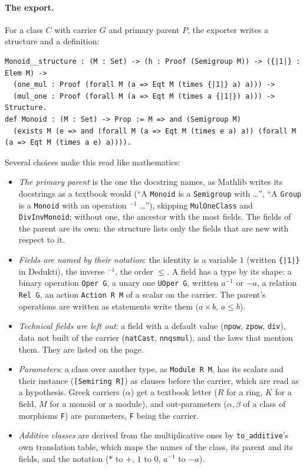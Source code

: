 \documentclass{easychair}
\newcommand{\ttt}[1]{\texttt{#1}}
\begin{document}
\paragraph{The export.} For a class $C$ with carrier $G$ and primary parent $P$, the exporter
writes a structure and a definition:
\begin{lstlisting}
Monoid__structure : (M : Set) -> (h : Proof (Semigroup M)) -> ({|1|} : Elem M) ->
  (one_mul : Proof (forall M (a => Eqt M (times {|1|} a) a))) ->
  (mul_one : Proof (forall M (a => Eqt M (times a {|1|}) a))) -> Structure.
def Monoid : (M : Set) -> Prop := M => and (Semigroup M)
  (exists M (e => and (forall M (a => Eqt M (times e a) a)) (forall M (a => Eqt M (times a e) a)))).
\end{lstlisting}
Several choices make this read like mathematics:
\begin{itemize}
\item \emph{The primary parent} is the one the docstring names, as Mathlib writes its docstrings
  as a textbook would (``A \ttt{Monoid} is a \ttt{Semigroup} with \ldots'', ``A \ttt{Group} is a
  \ttt{Monoid} with an operation ${}^{-1}$ \ldots''), skipping \ttt{MulOneClass} and
  \ttt{DivInvMonoid}; without one, the ancestor with the most fields. The fields of the parent
  are its own: the structure lists only the fields that are new with respect to it.
\item \emph{Fields are named by their notation}: the identity is a variable $1$ (written
  \ttt{\{|1|\}} in Dedukti), the inverse ${}^{-1}$, the order $\leq$. A field has a type by its
  shape: a binary operation \ttt{Oper G}, a unary one \ttt{UOper G}, written $a^{-1}$ or $-a$, a
  relation \ttt{Rel G}, an action \ttt{Action R M} of a scalar on the carrier. The parent's
  operations are written as statements write them ($a \times b$, $a \leq b$).
\item \emph{Technical fields are left out}: a field with a default value (\ttt{npow},
  \ttt{zpow}, \ttt{div}), data not built of the carrier (\ttt{natCast}, \ttt{nnqsmul}), and
  the laws that mention them. They are listed on the page.
\item \emph{Parameters}: a class over another type, as \ttt{Module R M}, has its scalars and
  their instance (\ttt{[Semiring R]}) as clauses before the carrier, which are read as a
  hypothesis. Greek carriers ($\alpha$) get a textbook letter ($R$ for a ring, $K$ for a field,
  $M$ for a monoid or a module), and out-parameters ($\alpha, \beta$ of a class of morphisms
  \ttt{F}) are parameters, \ttt{F} being the carrier.
\item \emph{Additive classes} are derived from the multiplicative ones by \ttt{to\_additive}'s
  own translation table, which maps the names of the class, its parent and its fields, and the
  notation ($*$ to $+$, $1$ to $0$, $a^{-1}$ to $-a$).
\end{itemize}
\end{document}
